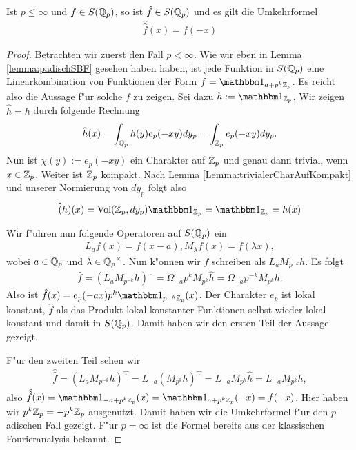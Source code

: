 		\begin{satz}\label{Satz:fourierumkehrformel}
			Ist $p\leq\infty$ und $f\in S({\mathbb{Q}_p})$, so ist $\hat{f} \in S({\mathbb{Q}_p})$ und es gilt die Umkehrformel
			\begin{align*}
				\hat{\hat{f}}(x) = f(-x)
			\end{align*}
		\end{satz}
		\begin{proof}
			Betrachten wir zuerst den Fall $p<\infty$. Wie wir eben in Lemma \ref{lemma:padischSBF} gesehen haben haben, ist jede Funktion in $S({\mathbb{Q}_p})$ eine Linearkombination von Funktionen der Form $f = \ind_{a+p^k\Zp}$. Es reicht also die Aussage f"ur solche $f$ zu zeigen.
			Sei dazu $h:= \ind_{\Zp}$. Wir zeigen $\hat{h} = h$ durch folgende Rechnung
			\begin{align*}
				\hat{h}(x) = \int_{\mathbb{Q}_p} h(y) e_p (-xy) dy_p = \int_{\mathbb{Z}_p} e_p(-xy) dy_p.
			\end{align*}
			Nun ist $\chi(y):=e_p(-xy)$ ein Charakter auf ${\mathbb{Z}_p}$ und genau dann trivial, wenn $x\in{\mathbb{Z}_p}$. 
			Weiter ist ${\mathbb{Z}_p}$ kompakt. 
			Nach Lemma \ref{Lemma:trivialerCharAufKompakt} und unserer Normierung von $dy_p$ folgt also
			\begin{align*}
				\hat(h)(x) = \text{Vol}(\Zp, dy_p) \ind_\Zp = \ind_\Zp = h(x)
			\end{align*}
			
			Wir f"uhren nun folgende Operatoren auf $S({\mathbb{Q}_p})$ ein
			\begin{align*}
				L_a f(x) = f(x-a), M_\lambda f(x) = f(\lambda x),
			\end{align*}
			wobei $a \in {\mathbb{Q}_p}$ und $\lambda \in {\mathbb{Q}_p}^\times$. 
			Nun k"onnen wir $f$ schreiben als $L_a M_{p^{-k}}h$. 
			Es folgt
			\begin{align*}
				\hat{f} = (L_a M_{p^{-k}}h)\widehat{\phantom{x}} = \Omega_{-a}p^{k}M_{p^k}\hat{h}=\Omega_{-a}p^{-k}M_{p^k}h.
			\end{align*}
			Also ist $\hat{f} (x) = e_p(-ax)p^k\ind_{p^{-k}\Zp}(x)$. 
			Der Charakter $e_p$ ist lokal konstant, $\hat{f}$ als das Produkt lokal konstanter Funktionen selbst wieder lokal konstant und damit in $S({\mathbb{Q}_p})$. 
			Damit haben wir den ersten Teil der Aussage gezeigt.
			
			F"ur den zweiten Teil sehen wir
			\begin{align*}
				\hat{\hat{f}} = (L_a M_{p^{-k}}h)\widehat{\widehat{\phantom{x}}} = L_{-a} (M_{p^k}h)\widehat{\widehat{\phantom{x}}}=L_{-a}M_{p^k}\hat{h} =L_{-a}M_{p^k}h,
			\end{align*}
			also $\hat{\hat{f}} (x) = \ind_{-a+p^k\Zp} (x) = \ind_{a+p^k\Zp} (-x) = f(-x)$. 
			Hier haben wir $p^k{\mathbb{Z}_p} = - p^k{\mathbb{Z}_p}$ ausgenutzt. 
			Damit haben wir die Umkehrformel f"ur den $p$-adischen Fall gezeigt. 
			F"ur $p=\infty$ ist die Formel bereits aus der klassischen Fourieranalysis bekannt.
		\end{proof}
	
